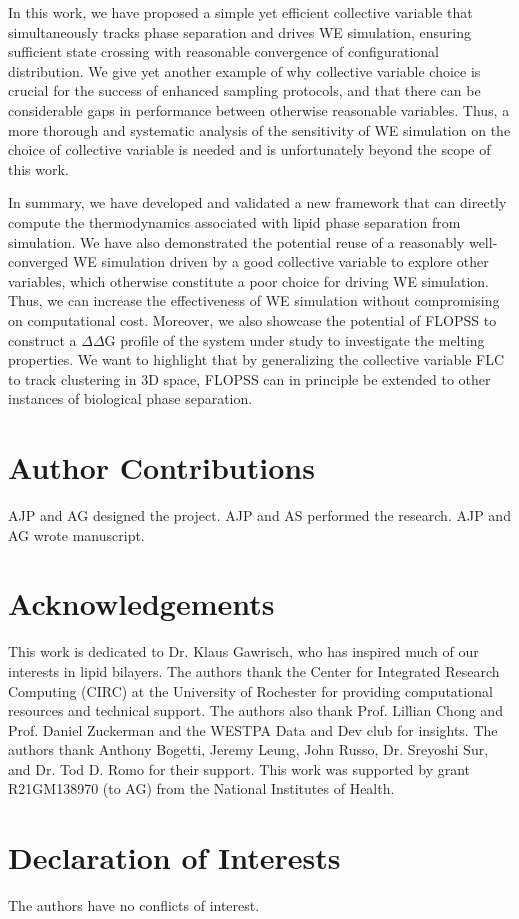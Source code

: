 \documentclass{biophys-new}
\begin{document}
In this work, we have proposed a simple yet efficient collective variable that
simultaneously tracks phase separation and drives WE simulation, ensuring
sufficient state crossing with reasonable convergence of configurational
distribution. We give yet another example of why collective variable choice is
crucial for the success of enhanced sampling protocols, and that there can be
considerable gaps in performance between otherwise reasonable variables. Thus,
a more thorough and systematic analysis of the sensitivity of WE simulation on
the choice of collective variable is needed and is unfortunately beyond the
scope of this work.

In summary, we have developed and validated a new framework that can directly compute the thermodynamics associated with lipid phase separation from simulation.
We have also demonstrated the potential reuse of a reasonably well-converged WE simulation driven by a good collective variable to explore other variables, which otherwise constitute a poor choice for driving WE simulation.
Thus, we can increase the effectiveness of WE simulation without compromising on computational cost.
Moreover, we also showcase the potential of FLOPSS to construct a $\Delta\Delta$G profile of the system under study to investigate the melting properties.
We want to highlight that by generalizing the collective variable FLC to track clustering in 3D space, FLOPSS can in principle be extended to other instances of biological phase separation.

\section*{Author Contributions}

AJP and AG designed the project. AJP and AS performed the research. AJP and AG wrote manuscript.

\section*{Acknowledgements}

This work is dedicated to Dr. Klaus Gawrisch, who has inspired much of our interests in lipid bilayers. The authors thank the Center for Integrated Research Computing (CIRC) at the University of Rochester for providing
computational resources and technical support. The authors also thank Prof. Lillian Chong and Prof. Daniel Zuckerman and
the WESTPA Data and Dev club for insights. The authors thank Anthony Bogetti, Jeremy Leung, John Russo, Dr. Sreyoshi Sur, and Dr. Tod D. Romo for their support.
This work was supported by grant R21GM138970 (to AG) from the National Institutes of Health.

\section*{Declaration of Interests}

The authors have no conflicts of interest.


\end{document}
